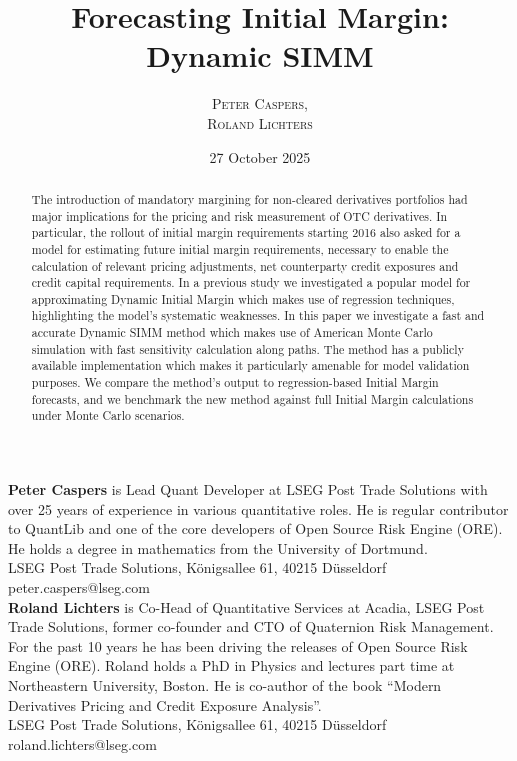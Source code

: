 \documentclass[11pt,a4paper,oneside]{article}
\newif\ifFigure\Figurefalse
\begin{document}
\Figuretrue

\thispagestyle{empty} %

\title{Forecasting Initial Margin: \\
  Dynamic SIMM}
\author{
  \scshape{Peter Caspers}, \\
  \scshape{Roland Lichters}}

\date{27 October 2025}

\maketitle

\noindent
    {\bf Peter Caspers} is Lead Quant Developer at LSEG Post Trade Solutions with over 25 years of experience in various quantitative roles.
    He is regular contributor to QuantLib and one of the core developers of Open Source Risk Engine (ORE).
    He holds a degree in mathematics from the University of Dortmund. \\
    \noindent
    LSEG Post Trade Solutions, K\"onigsallee 61, 40215 D\"usseldorf\\
    peter.caspers@lseg.com \\

    \noindent
    {\bf Roland Lichters} is Co-Head of Quantitative Services at Acadia, LSEG Post Trade Solutions,
    former co-founder and CTO of Quaternion Risk Management.
    For the past 10 years he has been driving the releases of Open Source Risk Engine (ORE).  
    Roland holds a PhD in Physics and lectures part time at Northeastern University, Boston.
    He is co-author of the book ``Modern Derivatives Pricing and Credit Exposure Analysis''. \\
    \noindent
    LSEG Post Trade Solutions, K\"onigsallee 61, 40215 D\"usseldorf\\
    roland.lichters@lseg.com 

\begin{abstract}

  The introduction of mandatory margining for non-cleared derivatives portfolios had major implications for the pricing 
  and risk measurement of OTC derivatives. In particular, the rollout of initial margin requirements starting 2016 also
  asked for a model for estimating future initial margin requirements, necessary to enable the calculation of relevant
  pricing adjustments, net counterparty credit exposures and credit capital requirements.
  In a previous study we investigated a popular model for approximating Dynamic Initial Margin which makes use of
  regression techniques, highlighting the model's systematic weaknesses. 
  In this paper we investigate a fast and accurate Dynamic SIMM method which makes use of American Monte Carlo simulation
  with fast sensitivity calculation along paths. The method has a publicly available implementation which makes it
  particularly amenable for model validation purposes.
  We compare the method's output to regression-based Initial Margin forecasts, and we benchmark the new method
  against full Initial Margin calculations under Monte Carlo scenarios. 

 \end{abstract}
\end{document}
